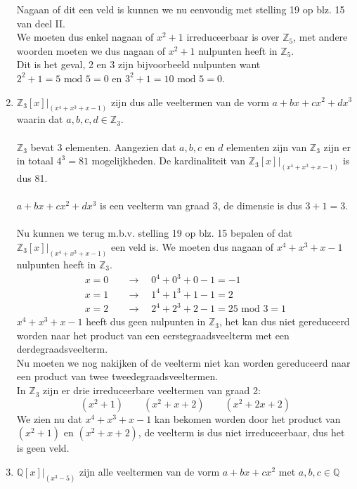 \documentclass[11pt,a4paper,titlepage]{article}
\begin{document}
\begin{enumerate}[label=(\alph*)]
		Nagaan of dit een veld is kunnen we nu eenvoudig met stelling 19 op blz. 15 van deel II.\\ 
		We moeten dus enkel nagaan of $x^2+1$ irreduceerbaar is over $\mathbb{Z}_5$, met andere woorden moeten we dus nagaan of $x^2+1$ nulpunten heeft in $\mathbb{Z}_5$.\\
		Dit is het geval, 2 en 3 zijn bijvoorbeeld nulpunten want $2^2 + 1 = 5 \text{ mod } 5 = 0$ en $3^2 + 1 = 10 \text{ mod } 5 = 0$.
	\item $\mathbb{Z}_3[x]|_{(x^4+x^3+x-1)}$ zijn dus alle veeltermen van de vorm $a + bx + cx^2 + dx^3$ waarin dat $a,b,c,d \in \mathbb{Z}_3$. \\ \\
		$\mathbb{Z}_3$ bevat 3 elementen. Aangezien dat $a,b,c$ en $d$ elementen zijn van $\mathbb{Z}_3$ zijn er in totaal $4^3 = 81$ mogelijkheden. De kardinaliteit van $\mathbb{Z}_3[x]|_{(x^4+x^3+x-1)}$ is dus 81. \\ \\
		 $a + bx + cx^2 + dx^3$ is een veelterm van graad 3, de dimensie is dus $3+1 = 3$.\\ \\
		Nu kunnen we terug m.b.v. stelling 19 op blz. 15 bepalen of dat $\mathbb{Z}_3[x]|_{(x^4+x^3+x-1)}$ een veld is. We moeten dus nagaan of $x^4+x^3+x-1$ nulpunten heeft in $\mathbb{Z}_3$.
		\begin{align*}
			x = 0 \quad &\rightarrow \quad 0^4+0^3+0-1 = -1\\
			x = 1 \quad &\rightarrow \quad 1^4 + 1^3 + 1 -1 = 2\\
			x = 2 \quad &\rightarrow \quad 2^4 + 2^3 + 2 -1 = 25 \text{ mod } 3 = 1
		\end{align*}
		$x^4+x^3+x-1$ heeft dus geen nulpunten in $\mathbb{Z}_3$, het kan dus niet gereduceerd worden naar het product van een eerstegraadsveelterm met een derdegraadsveelterm.\\
		Nu moeten we nog nakijken of de veelterm niet kan worden gereduceerd naar een product van twee tweedegraadsveeltermen. \\
		In $\mathbb{Z}_3$ zijn er drie irreduceerbare veeltermen van graad 2:
			$$(x^2 + 1) \quad \quad (x^2+x+2) \quad \quad (x^2+2x+2)$$
		We zien nu dat $x^4+x^3+x-1$ kan bekomen worden door het product van $(x^2 + 1)$ en $(x^2+x+2)$, de veelterm is dus niet irreduceerbaar, dus het is geen veld.
	\item $\mathbb{Q}[x]|_{(x^3-5)}$ zijn alle veeltermen van de vorm $a + bx + cx^2$ met $a,b,c \in \mathbb{Q}$ \\ \\

\end{enumerate}
\end{document}
